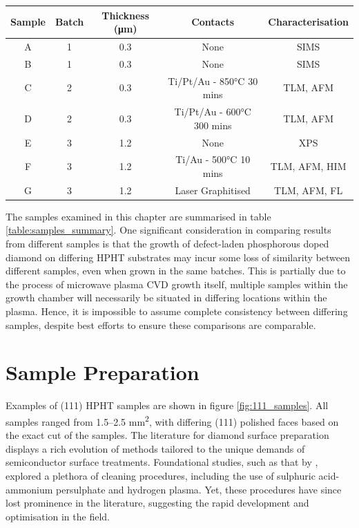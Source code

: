 \begin{refsection}
\begin{table}[h]
\begin{tabular}{|c|c|c|c|c|}
\hline
Sample & Batch & Thickness (\si{\micro\metre}) & Contacts & Characterisation \\
\hline
A & 1 & 0.3 & None & SIMS \\
B & 1 & 0.3 & None & SIMS \\
C & 2 & 0.3 & Ti/Pt/Au - 850\si{\degreeCelsius} 30 mins  & TLM, AFM \\
D & 2 & 0.3 & Ti/Pt/Au - 600\si{\degreeCelsius} 300 mins & TLM, AFM \\
E & 3 & 1.2 & None & XPS \\
F & 3 & 1.2 & Ti/Au - 500\si{\degreeCelsius} 10 mins     & TLM, AFM, HIM \\
G & 3 & 1.2 & Laser Graphitised                          & TLM, AFM, FL \\
\hline
\end{tabular}
\end{table}

The samples examined in this chapter are summarised in table \ref{table:samples_summary}. One significant consideration in comparing results from different samples is that the growth of defect-laden phosphorous doped diamond on differing HPHT substrates may incur some loss of similarity between different samples, even when grown in the same batches. This is partially due to the process of microwave plasma CVD growth itself, multiple samples within the growth chamber will necessarily be situated in differing locations within the plasma. Hence, it is impossible to assume complete consistency between differing samples, despite best efforts to ensure these comparisons are comparable.

\section{Sample Preparation}
Examples of (111) HPHT samples are shown in figure \ref{fig:111_samples}. All samples ranged from 1.5--2.5 \si{\milli\metre\squared}, with differing (111) polished faces based on the exact cut of the samples. The literature for diamond surface preparation displays a rich evolution of methods tailored to the unique demands of semiconductor surface treatments. Foundational studies, such as that by \cite{baral1996}, explored a plethora of cleaning procedures, including the use of sulphuric acid-ammonium persulphate and hydrogen plasma. Yet, these procedures have since lost prominence in the literature, suggesting the rapid development and optimisation in the field.


\end{refsection}
